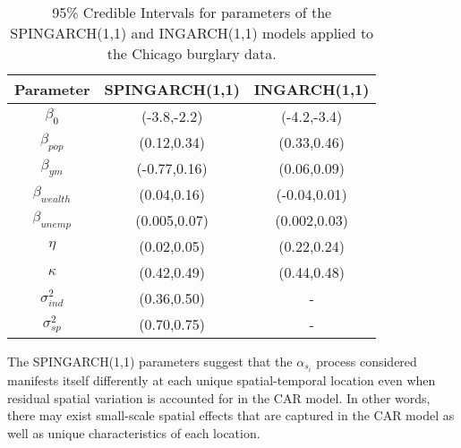\documentclass[11pt]{isuthesis}
\begin{document}
\begin{table}[h]
	\begin{center}
		\begin{tabular}{ |c|c|c| } 
			\hline
			Parameter & SPINGARCH(1,1) & INGARCH(1,1) \\
			\hline 
			$\beta_0$ & (-3.8,-2.2) & (-4.2,-3.4) \\
			$\beta_{pop}$ & (0.12,0.34) & (0.33,0.46)\\
			$\beta_{ym}$ & (-0.77,0.16)& (0.06,0.09)\\
			$\beta_{wealth}$&(0.04,0.16) & (-0.04,0.01)\\
			$\beta_{unemp}$ & (0.005,0.07)& (0.002,0.03) \\
			$\eta$ & (0.02,0.05) & (0.22,0.24)\\
			$\kappa$ & (0.42,0.49)& (0.44,0.48)\\
			$\sigma_{ind}^2$ & (0.36,0.50) & - \\
			$\sigma_{sp}^2$& (0.70,0.75)& - \\
			\hline
		\end{tabular}
	\end{center}
	\caption{95\% Credible Intervals for parameters of the SPINGARCH(1,1) and INGARCH(1,1) models applied to the Chicago burglary data.}\label{Table:Results}
\end{table}

The SPINGARCH(1,1) parameters suggest that the $\alpha_{s_i}$ process considered manifests itself differently at each unique spatial-temporal location even when residual spatial variation is accounted for in the CAR model.  In other words, there may exist small-scale spatial effects that are captured in the CAR model as well as unique characteristics of each location.
\end{document}
